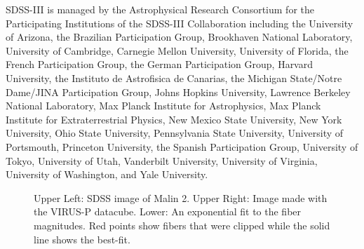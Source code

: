 \documentclass{emulateapj}
\begin{document}
SDSS-III is managed by the Astrophysical Research Consortium for the Participating Institutions of the SDSS-III Collaboration including the University of Arizona, the Brazilian Participation Group, Brookhaven National Laboratory, University of Cambridge, Carnegie Mellon University, University of Florida, the French Participation Group, the German Participation Group, Harvard University, the Instituto de Astrofisica de Canarias, the Michigan State/Notre Dame/JINA Participation Group, Johns Hopkins University, Lawrence Berkeley National Laboratory, Max Planck Institute for Astrophysics, Max Planck Institute for Extraterrestrial Physics, New Mexico State University, New York University, Ohio State University, Pennsylvania State University, University of Portsmouth, Princeton University, the Spanish Participation Group, University of Tokyo, University of Utah, Vanderbilt University, University of Virginia, University of Washington, and Yale University.



%
%





\begin{figure}
\caption{Upper Left:  SDSS image of Malin 2.  Upper Right:  Image made with the VIRUS-P datacube.  Lower:  An exponential fit to the fiber magnitudes.  Red points show fibers that were clipped while the solid line shows the best-fit.  \label{Malin2_fibers} }
\end{figure}









\end{document}
